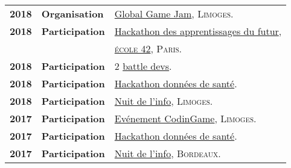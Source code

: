 \begin{supertabular}{lll}
    \textbf{2018} & \textbf{Organisation} & \href{https://globalgamejam.org}{Global Game Jam}, \textsc{Limoges}.\\
    \textbf{2018} & \textbf{Participation} & \href{https://www.concepteursdavenirs.fr/nos-evenements-et-concours/hackathon-des-apprentissages-du-futur}{Hackathon des apprentissages du futur},\\
    & & \textsc{\href{https://www.42.fr}{\'ecole 42}, Paris}.\\
    \textbf{2018} & \textbf{Participation} & 2 \href{https://battledev.blogdumoderateur.com}{battle devs}.\\
    \textbf{2018} & \textbf{Participation} & \href{https://www.3il-ingenieurs.fr/hackathon-3il-silpc}{Hackathon donn\'ees de sant\'e}.\\
    \textbf{2018} & \textbf{Participation} & \href{https://www.nuitdelinfo.com}{Nuit de l'info}, \textsc{Limoges}.\\
    \textbf{2017} & \textbf{Participation} & \href{https://www.codingame.com}{Ev\'enement CodinGame}, \textsc{Limoges}.\\
    \textbf{2017} & \textbf{Participation} & \href{https://www.3il-ingenieurs.fr/hackathon-3il-silpc}{Hackathon donn\'ees de sant\'e}.\\
    \textbf{2017} & \textbf{Participation} & \href{https://www.nuitdelinfo.com}{Nuit de l'info}, \textsc{Bordeaux}.\\
\end{supertabular}
